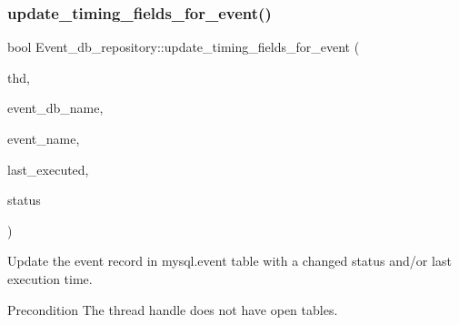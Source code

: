 \subsubsection{\texorpdfstring{update\+\_\+timing\+\_\+fields\+\_\+for\+\_\+event()}{update\_timing\_fields\_for\_event()}}
{\footnotesize\ttfamily bool Event\+\_\+db\+\_\+repository\+::update\+\_\+timing\+\_\+fields\+\_\+for\+\_\+event (\begin{DoxyParamCaption}\item[{T\+HD $\ast$}]{thd,  }\item[{L\+E\+X\+\_\+\+S\+T\+R\+I\+NG}]{event\+\_\+db\+\_\+name,  }\item[{L\+E\+X\+\_\+\+S\+T\+R\+I\+NG}]{event\+\_\+name,  }\item[{my\+\_\+time\+\_\+t}]{last\+\_\+executed,  }\item[{ulonglong}]{status }\end{DoxyParamCaption})}

Update the event record in mysql.\+event table with a changed status and/or last execution time.

\begin{DoxyPrecond}{Precondition}
The thread handle does not have open tables. 
\end{DoxyPrecond}
